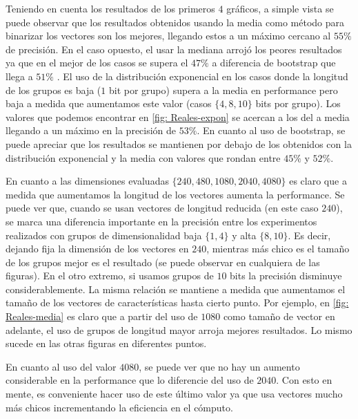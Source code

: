 	Teniendo en cuenta los resultados de los primeros $4$ gráficos, a simple vista se puede observar que los resultados obtenidos usando la media como método para binarizar los vectores son los mejores, llegando estos a un máximo cercano al $55\%$ de precisión. En el caso opuesto, el usar la mediana arrojó los peores resultados ya que en el mejor de los casos se supera el $47\%$ a diferencia de bootstrap que llega a $51\%$ . El uso de la distribución exponencial en los casos donde la longitud de los grupos es baja ($1$ bit por grupo) supera a la media en performance pero baja a medida que aumentamos este valor (casos $\{ 4, 8, 10\}$ bits por grupo). Los valores que podemos encontrar en \ref{fig: Reales-expon} se acercan a los del a media llegando a un máximo en la precisión de $53\%$. En cuanto al uso de bootstrap, se puede apreciar que los resultados se mantienen por debajo de los obtenidos con la distribución exponencial y la media con valores que rondan entre $45\%$ y $52\%$.

	En cuanto a las dimensiones evaluadas $\{ 240, 480, 1080, 2040, 4080 \}$ es claro que a medida que aumentamos la longitud de los vectores aumenta la performance. Se puede ver que, cuando se usan vectores de longitud reducida (en este caso $240$), se marca una diferencia importante en la precisión entre los experimentos realizados con grupos de dimensionalidad baja $\{ 1, 4 \}$ y alta $\{8, 10\}$. Es decir, dejando fija la dimensión de los vectores en $240$, mientras más chico es el tamaño de los grupos mejor es el resultado (se puede observar en cualquiera de las figuras). En el otro extremo, si usamos grupos de $10$ bits la precisión disminuye considerablemente. La misma relación se mantiene a medida que aumentamos el tamaño de los vectores de características hasta cierto punto. Por ejemplo, en \ref{fig: Reales-media} es claro que a partir del uso de $1080$ como tamaño de vector en adelante, el uso de grupos de longitud mayor arroja mejores resultados. Lo mismo sucede en las otras figuras en diferentes puntos.

	En cuanto al uso del valor $4080$, se puede ver que no hay un aumento considerable en la performance que lo diferencie del uso de $2040$. Con esto en mente, es conveniente hacer uso de este último valor ya que usa vectores mucho más chicos incrementando la eficiencia en el cómputo.

